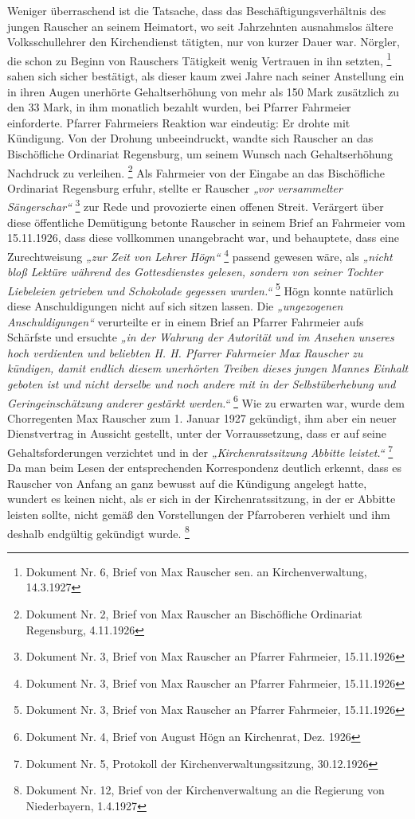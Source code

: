 \documentclass[a4paper]{article}
\newcommand\textstyleZitate[1]{\textit{#1}}
\newcounter{Abb}
\begin{document}
Weniger überraschend ist die Tatsache, dass das Beschäftigungsverhältnis
des jungen Rauscher an seinem Heimatort, wo seit Jahrzehnten
ausnahmslos ältere Volksschullehrer den Kirchendienst tätigten, nur von
kurzer Dauer war. Nörgler, die schon zu Beginn von Rauschers Tätigkeit
wenig Vertrauen in ihn setzten, \footnote{Dokument Nr. 6, Brief von Max
Rauscher sen. an Kirchenverwaltung, 14.3.1927} sahen sich sicher
bestätigt, als dieser kaum zwei Jahre nach seiner Anstellung ein in
ihren Augen unerhörte Gehaltserhöhung von mehr als 150 Mark zusätzlich
zu den 33 Mark, in ihm monatlich bezahlt wurden, bei Pfarrer Fahrmeier
einforderte. Pfarrer Fahrmeiers Reaktion war eindeutig: Er drohte mit
Kündigung. Von der Drohung unbeeindruckt, wandte sich Rauscher an das
Bischöfliche Ordinariat Regensburg, um seinem Wunsch nach
Gehaltserhöhung Nachdruck zu verleihen. \footnote{Dokument Nr. 2, Brief
von Max Rauscher an Bischöfliche Ordinariat Regensburg, 4.11.1926} Als
Fahrmeier von der Eingabe an das Bischöfliche Ordinariat Regensburg
erfuhr, stellte er Rauscher \textstyleZitate{„vor versammelter
Sängerschar“}  \footnote{Dokument Nr. 3, Brief von Max Rauscher an
Pfarrer Fahrmeier, 15.11.1926} zur Rede und provozierte einen offenen
Streit. Verärgert über diese öffentliche Demütigung betonte Rauscher in
seinem Brief an Fahrmeier vom 15.11.1926, dass diese vollkommen
unangebracht war, und behauptete, dass eine Zurechtweisung
\textstyleZitate{„zur Zeit von Lehrer Högn“ } \footnote{Dokument Nr. 3,
Brief von Max Rauscher an Pfarrer Fahrmeier,
15.11.1926}\textstyleZitate{ }passend gewesen wäre, als
\textstyleZitate{„nicht bloß Lektüre während des Gottesdienstes
gelesen, sondern von seiner Tochter Liebeleien getrieben und Schokolade
gegessen wurden.“ } \footnote{Dokument Nr. 3, Brief von Max Rauscher an
Pfarrer Fahrmeier, 15.11.1926} Högn konnte natürlich diese
Anschuldigungen nicht auf sich sitzen lassen. Die
\textstyleZitate{„ungezogenen Anschuldigungen“} verurteilte er in einem
Brief an Pfarrer Fahrmeier aufs Schärfste und ersuchte
\textstyleZitate{„in der Wahrung der Autorität und im Ansehen unseres
hoch verdienten und beliebten H. H. Pfarrer Fahrmeier Max Rauscher zu
kündigen, damit endlich diesem unerhörten Treiben dieses jungen Mannes
Einhalt geboten ist und nicht derselbe und noch andere mit in der
Selbstüberhebung und Geringeinschätzung anderer gestärkt werden.“
} \footnote{Dokument Nr. 4, Brief von August Högn an Kirchenrat, Dez.
1926} Wie zu erwarten war, wurde dem Chorregenten Max Rauscher zum 1.
Januar 1927 gekündigt, ihm aber ein neuer Dienstvertrag in Aussicht
gestellt, unter der Vorraussetzung, dass er auf seine
Gehaltsforderungen verzichtet und in der
\textstyleZitate{„Kirchenratssitzung Abbitte leistet.“ }\footnote{
Dokument Nr. 5, Protokoll der Kirchenverwaltungssitzung, 30.12.1926} Da
man beim Lesen der entsprechenden Korrespondenz deutlich erkennt, dass
es Rauscher von Anfang an ganz bewusst auf die Kündigung angelegt
hatte, wundert es keinen nicht, als er sich in der Kirchenratssitzung,
in der er Abbitte leisten sollte, nicht gemäß den Vorstellungen der
Pfarroberen verhielt und ihm deshalb endgültig gekündigt
wurde. \footnote{Dokument Nr. 12, Brief von der Kirchenverwaltung an
die Regierung von Niederbayern, 1.4.1927}
\end{document}
